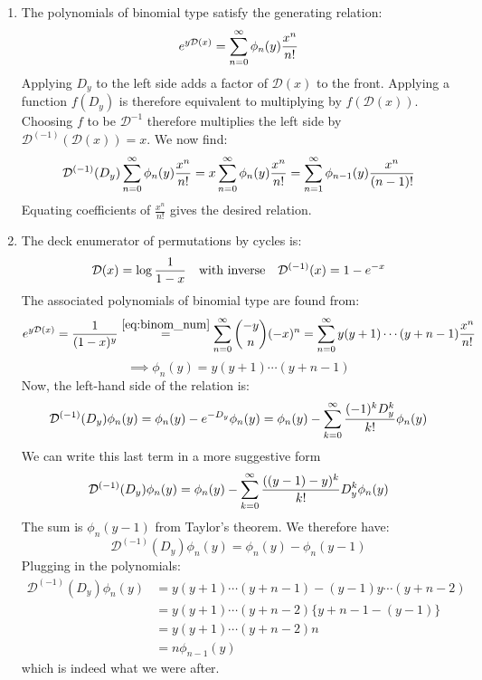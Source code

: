\begin{solution}
    \begin{enumerate}[label=(\alph*)]
        \item The polynomials of binomial type satisfy the generating relation:
        \[
            e^{y\mathcal{D}(x)} = \bsum \phi_n(y)\frac{x^n}{n!}
        \]
        Applying $D_y$ to the left side adds a factor of $\mathcal{D}(x)$ to the front. Applying a function $f(D_y)$ is therefore equivalent to multiplying by $f(\mathcal{D}(x))$. Choosing $f$ to be $\mathcal{D}^{-1}$ therefore multiplies the left side by $\mathcal{D}^{(-1)}(\mathcal{D}(x)) = x$. We now find:
        \[
            \mathcal{D}^{(-1)}(D_y) \bsum \phi_n(y) \frac{x^n}{n!} = x\bsum \phi_n(y) \frac{x^n}{n!} = \sum_{n=1}^\infty \phi_{n-1}(y)\frac{x^n}{(n-1)!}
        \]
        Equating coefficients of $\frac{x^n}{n!}$ gives the desired relation.
        \item The deck enumerator of permutations by cycles is:
        \[
            \mathcal{D}(x) = \log\frac{1}{1-x} \quad \textnormal{with inverse} \quad  \mathcal{D}^{(-1)}(x) = 1-e^{-x}
        \]
        The associated polynomials of binomial type are found from:
        \[
            e^{y\mathcal{D}(x)} = \frac{1}{(1-x)^y} \estep{\eqref{eq:binom_num}} \bsum \binom{-y}{n}(-x)^n = \bsum y(y+1)\cdots (y+n-1) \frac{x^n}{n!}
        \]
        \[
            \implies \phi_n(y) = y(y+1)\cdots (y+n-1)
        \]
        Now, the left-hand side of the relation is:
        \[
            \mathcal{D}^{(-1)}(D_y)\phi_n(y) = \phi_n(y) - e^{-D_y}\phi_n(y) = \phi_n(y) - \bsum[k] \frac{(-1)^k D_y^k}{k!}\phi_n(y) 
        \]
        We can write this last term in a more suggestive form
        \[
            \mathcal{D}^{(-1)}(D_y)\phi_n(y) = \phi_n(y) - \bsum[k] \frac{((y-1) - y)^k}{k!} D_y^k\phi_n(y)
        \]
        The sum is $\phi_n(y-1)$ from Taylor's theorem. We therefore have:
        \[
            \mathcal{D}^{(-1)}(D_y)\phi_n(y) = \phi_n(y) - \phi_n(y-1)
        \]
        Plugging in the polynomials:
        \begin{align*}
            \mathcal{D}^{(-1)}(D_y)\phi_n(y) &= y(y+1)\cdots (y+n-1) - (y-1)y\cdots (y+n-2) \\
            &= y(y+1)\cdots(y+n-2)\big\{y+n-1 - (y-1)\big\} \\
            &= y(y+1)\cdots (y+n-2)n \\
            &= n\phi_{n-1}(y)
        \end{align*}
        which is indeed what we were after.
    \end{enumerate}
\end{solution}

